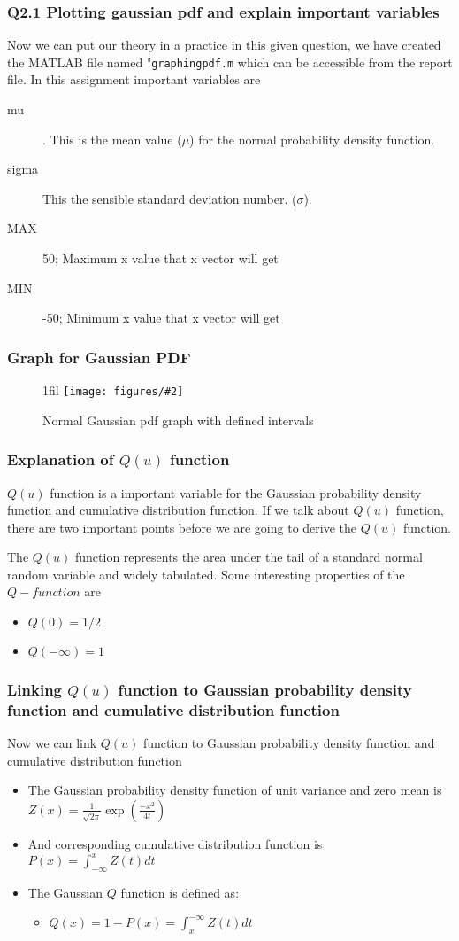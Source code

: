 \documentclass{beamer}
\makeatletter
\newcommand{\code}[1]{\texttt{#1}}
\newcommand*{\centerfloat}{%
  \parindent \z@
  \leftskip \z@ \@plus 1fil \@minus \textwidth
  \rightskip\leftskip
  \parfillskip \z@skip}
\newcommand{\fig}[3]{
  \begin{figure}[H]
  \centerfloat
    \texttt{[image: figures/\#2]}
    \caption{#3}
  \end{figure}
}
\makeatother
\begin{document}
\begin{frame}
	\frametitle{Q2.1 Plotting gaussian pdf and explain important variables}
Now we can put our theory in a practice in this given question, we have created the MATLAB file named "\code{graphingpdf.m} which can be accessible from the report file. 
In this assignment important variables are
\begin{description}
	\item [mu] . This is the mean value ($\mu$) for the normal probability density function.
	\item [sigma] This the sensible standard deviation number. ($\sigma$).
	\item [MAX] 50; Maximum x value that x vector will get 
	\item [MIN] -50; Minimum x value that x vector will get
\end{description}
\end{frame}

\begin{frame}
	\frametitle{Graph for Gaussian PDF}
\fig{5cm}{normalgaussiangraph.png}{Normal Gaussian pdf graph with defined intervals}
\end{frame}

\begin{frame}
	\frametitle{Explanation of $Q(u)$ function}
	$Q(u)$ function is a important variable for the Gaussian probability density function and cumulative distribution function. If we talk about $Q(u)$  function, there are two important points before we are going to derive the $Q(u)$ function.

	The $Q(u)$ function represents the area under the tail of a standard normal random variable and widely tabulated. Some interesting properties of the $Q- function$ are
	\begin{itemize}
		\item $Q(0)=1/2$
		\item $Q(-\infty)=1$
	\end{itemize}
\end{frame}
\begin{frame}
	\frametitle{Linking $Q(u)$ function to Gaussian probability density function and cumulative distribution function}
Now we can link $Q(u)$ function to Gaussian probability density function and cumulative distribution function 
\begin{itemize}
	\item The Gaussian probability density function of unit variance and zero mean is $Z(x)=\frac{1}{\sqrt{2\pi}} \exp(\frac{-x^2}{4t})$
	\item And corresponding cumulative distribution function is $P(x)=\int_{-\infty}^{x} Z(t) dt$
	\item The Gaussian $Q$ function is defined as:
		\begin{itemize}
			\item $ Q(x) = 1-P(x)=\int_{x}^{-\infty} Z(t) dt$
		\end{itemize}
\end{itemize}
\end{frame}
\end{document}
